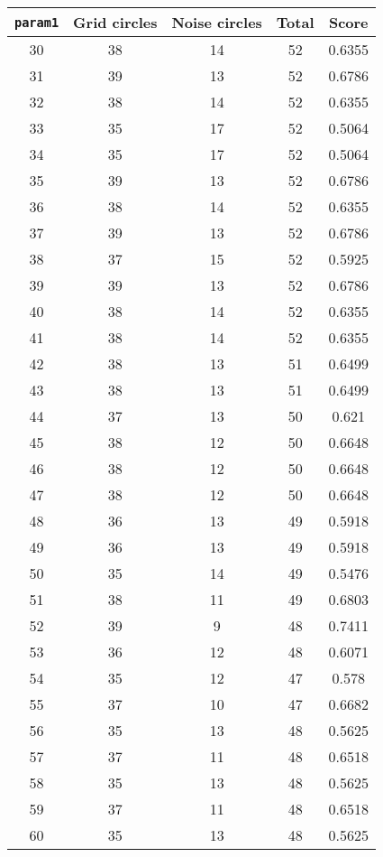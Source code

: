 \documentclass[letterpaper, 12pt]{article}
\begin{document}
\begin{longtable}{|c|c|c|c|c|}
\hline
\textbf{\texttt{param1}} & \textbf{Grid circles} & \textbf{Noise circles} & \textbf{Total} & \textbf{Score} \\
\hline
30 & 38 & 14 & 52 & 0.6355 \\
\hline
31 & 39 & 13 & 52 & 0.6786 \\
\hline
32 & 38 & 14 & 52 & 0.6355 \\
\hline
33 & 35 & 17 & 52 & 0.5064 \\
\hline
34 & 35 & 17 & 52 & 0.5064 \\
\hline
35 & 39 & 13 & 52 & 0.6786 \\
\hline
36 & 38 & 14 & 52 & 0.6355 \\
\hline
37 & 39 & 13 & 52 & 0.6786 \\
\hline
38 & 37 & 15 & 52 & 0.5925 \\
\hline
39 & 39 & 13 & 52 & 0.6786 \\
\hline
40 & 38 & 14 & 52 & 0.6355 \\
\hline
41 & 38 & 14 & 52 & 0.6355 \\
\hline
42 & 38 & 13 & 51 & 0.6499 \\
\hline
43 & 38 & 13 & 51 & 0.6499 \\
\hline
44 & 37 & 13 & 50 & 0.621 \\
\hline
45 & 38 & 12 & 50 & 0.6648 \\
\hline
46 & 38 & 12 & 50 & 0.6648 \\
\hline
47 & 38 & 12 & 50 & 0.6648 \\
\hline
48 & 36 & 13 & 49 & 0.5918 \\
\hline
49 & 36 & 13 & 49 & 0.5918 \\
\hline
50 & 35 & 14 & 49 & 0.5476 \\
\hline
51 & 38 & 11 & 49 & 0.6803 \\
\hline
52 & 39 & 9 & 48 & 0.7411 \\
\hline
53 & 36 & 12 & 48 & 0.6071 \\
\hline
54 & 35 & 12 & 47 & 0.578 \\
\hline
55 & 37 & 10 & 47 & 0.6682 \\
\hline
56 & 35 & 13 & 48 & 0.5625 \\
\hline
57 & 37 & 11 & 48 & 0.6518 \\
\hline
58 & 35 & 13 & 48 & 0.5625 \\
\hline
59 & 37 & 11 & 48 & 0.6518 \\
\hline
60 & 35 & 13 & 48 & 0.5625 \\

\end{longtable}
\end{document}
